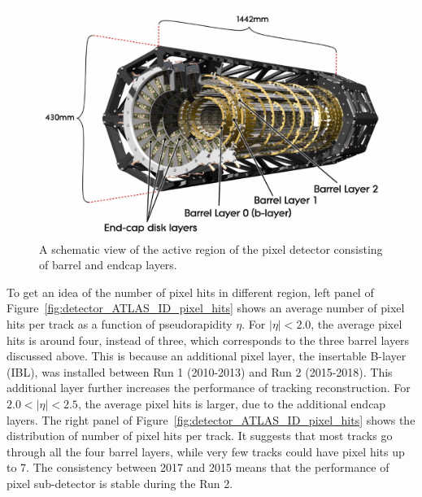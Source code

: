 \begin{figure}[H]
\centering
\includegraphics[width=.95\linewidth]{figs/chapter_detector/ATLAS_ID_pixel.png}
\caption{A schematic view of the active region of the pixel detector consisting of barrel and endcap layers.}
\label{fig:detector_ATLAS_ID_pixel}
\end{figure}

To get an idea of the number of pixel hits in different region, left panel of Figure~\ref{fig:detector_ATLAS_ID_pixel_hits} shows an average number of pixel hits per track as a function of pseudorapidity $\eta$. For $|\eta|<2.0$, the average pixel hits is around four, instead of three, which corresponds to the three barrel layers discussed above. This is because an additional pixel layer, the insertable B-layer (IBL), was installed between Run 1 (2010-2013) and Run 2 (2015-2018). This additional layer further increases the performance of tracking reconstruction. For $2.0<|\eta|<2.5$, the average pixel hits is larger, due to the additional endcap layers. The right panel of Figure~\ref{fig:detector_ATLAS_ID_pixel_hits} shows the distribution of number of pixel hits per track. It suggests that most tracks go through all the four barrel layers, while very few tracks could have pixel hits up to 7. The consistency between 2017 and 2015 means that the performance of pixel sub-detector is stable during the Run 2.


